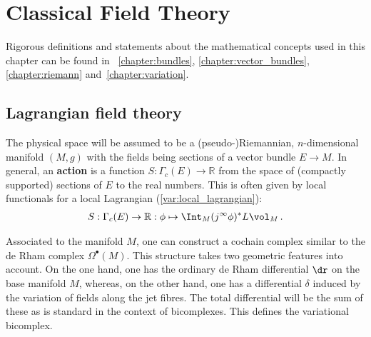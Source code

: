 \chapter{Classical Field Theory}\label{chapter:classical_fields}

    Rigorous definitions and statements about the mathematical concepts used in this chapter can be found in ~\ref{chapter:bundles}, \ref{chapter:vector_bundles}, \ref{chapter:riemann} and~\ref{chapter:variation}.

    \minitoc

\section{Lagrangian field theory}

    The physical space will be assumed to be a (pseudo-)Riemannian, $n$-dimensional manifold $(M,g)$ with the fields being sections of a vector bundle $E\rightarrow M$. In general, an \textbf{action} is a function $S:\Gamma_c(E)\rightarrow\mathbb{R}$ from the space of (compactly supported) sections of $E$ to the real numbers. This is often given by local functionals for a local Lagrangian (\cref{var:local_lagrangian}):
    \begin{gather}
        S:\Gamma_c(E)\rightarrow\mathbb{R}:\phi\mapsto\Int_M(j^\infty\phi)^*L\vol_M\,.
    \end{gather}

    Associated to the manifold $M$, one can construct a cochain complex similar to the de Rham complex $\Omega^\bullet(M)$. This structure takes two geometric features into account. On the one hand, one has the ordinary de Rham differential $\dr$ on the base manifold $M$, whereas, on the other hand, one has a differential $\delta$ induced by the variation of fields along the jet fibres. The total differential will be the sum of these as is standard in the context of bicomplexes. This defines the variational bicomplex.

